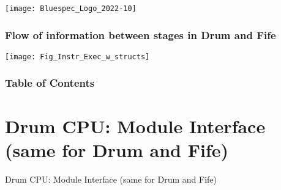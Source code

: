 


\date{L10: RISC-V: The Drum CPU}





\begin{frame}
 \titlepage

 \begin{center}
  \texttt{[image: Bluespec\_Logo\_2022-10]}
 \end{center}

\end{frame}





\begin{frame}
\frametitle{Flow of information between stages in Drum and Fife}

\label{Slide_Instr_Steps}

\footnotesize

\begin{center}
 \texttt{[image: Fig\_Instr\_Exec\_w\_structs]}
\end{center}

\end{frame}


\begin{frame}
\frametitle{Table of Contents}

\tableofcontents

\end{frame}


\section{Drum CPU: Module Interface (same for Drum and Fife)}

\begin{frame}

\begin{center}
  {\LARGE Drum CPU: Module Interface (same for Drum and Fife)}
\end{center}

\end{frame}

